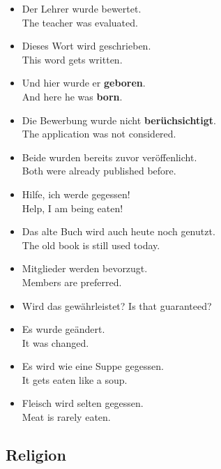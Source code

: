 \begin{itemize}
  \item  Der Lehrer wurde bewertet. \\
  The teacher was evaluated.
  \item  Dieses Wort wird geschrieben. \\
  This word gets written.
  \item  Und hier wurde er \textbf{geboren}. \\
  And here he was \textbf{born}.
  \item  Die Bewerbung wurde nicht \textbf{ber{\"u}chsichtigt}. \\
  The application was not considered.
  \item  Beide wurden bereits zuvor ver{\"o}ffenlicht. \\
  Both were already published before.
  \item  Hilfe, ich werde gegessen! \\
  Help, I am being eaten!
  \item  Das alte Buch wird auch heute noch genutzt. \\
  The old book is still used today.
  \item  Mitglieder werden bevorzugt. \\
  Members are preferred.
  \item  Wird das gew{\"a}hrleistet? 
  Is that guaranteed?
  \item  Es wurde ge{\"a}ndert. \\
  It was changed.
  \item  Es wird wie eine Suppe gegessen. \\
  It gets eaten like a soup.
  \item  Fleisch wird selten gegessen. \\
  Meat is rarely eaten.
\end{itemize}


\pagebreak
\subsection{Religion}

